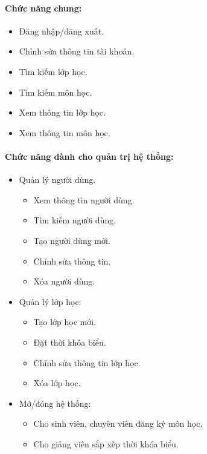 \documentclass[12pt]{book}
\begin{document}
    \paragraph{Chức năng chung:}
    \begin{itemize}
      \item Đăng nhập/đăng xuất.
      \item Chỉnh sửa thông tin tài khoản.
      \item Tìm kiếm lớp học.
      \item Tìm kiếm môn học.
      \item Xem thông tin lớp học.
      \item Xem thông tin môn học.
    \end{itemize}

    \paragraph{Chức năng dành cho quản trị hệ thống:}
    \begin{itemize}
      \item Quản lý người dùng.
      \begin{itemize}
        \item Xem thông tin người dùng.
        \item Tìm kiếm người dùng.
        \item Tạo người dùng mới.
        \item Chỉnh sửa thông tin.
        \item Xóa người dùng.
      \end{itemize}
      \item Quản lý lớp học:
      \begin{itemize}
        \item Tạo lớp học mới.
        \item Đặt thời khóa biểu.
        \item Chỉnh sửa thông tin lớp học.
        \item Xóa lớp học.
      \end{itemize}
      \item Mở/đóng hệ thống:
      \begin{itemize}
        \item Cho sinh viên, chuyên viên đăng ký môn học.
        \item Cho giảng viên sắp xếp thời khóa biểu.
      \end{itemize}
    \end{itemize}
\end{document}
